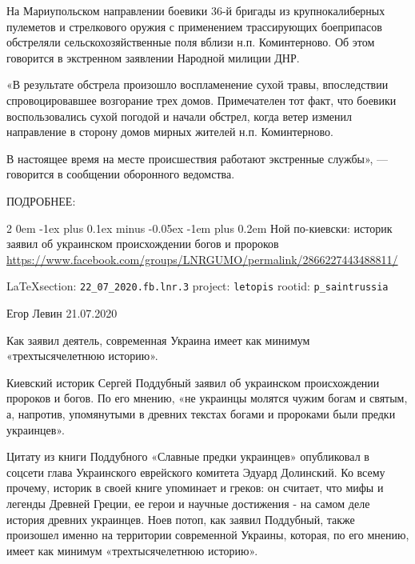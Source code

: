\documentclass[a4paper,11pt]{extreport}
\makeatletter
\renewcommand\subsection{%
  \clearpage
    \@startsection{subsection}%
    {2}%
    {0em}%
    {-1ex plus 0.1ex minus -0.05ex}%
    {-1em plus 0.2em}%
    {\scshape\bfseries\Large}%
}
\makeatother
\begin{document}
На Мариупольском направлении боевики 36-й бригады из крупнокалиберных пулеметов
и стрелкового оружия с применением трассирующих боеприпасов обстреляли
сельскохозяйственные поля вблизи н.п. Коминтерново. Об этом говорится в
экстренном заявлении Народной милиции ДНР.

«В результате обстрела произошло воспламенение сухой травы, впоследствии
спровоцировавшее возгорание трех домов. Примечателен тот факт, что боевики
воспользовались сухой погодой и начали обстрел, когда ветер изменил направление
в сторону домов мирных жителей н.п. Коминтерново.

В настоящее время на месте происшествия работают экстренные службы», —
говорится в сообщении оборонного ведомства.

ПОДРОБНЕЕ:
 
 
  
\subsection{Ной по-киевски: историк заявил об украинском происхождении богов и пророков}
\label{sec:22_07_2020.fb.lnr.3}
\url{https://www.facebook.com/groups/LNRGUMO/permalink/2866227443488811/}

\vspace{0.5cm}
{\small\LaTeX section: \verb|22_07_2020.fb.lnr.3| project: \verb|letopis| rootid: \verb|p_saintrussia|}
\vspace{0.5cm}


Егор Левин
21.07.2020

Как заявил деятель, современная Украина имеет как минимум «трехтысячелетнюю
историю».

Киевский историк Сергей Поддубный заявил об украинском происхождении пророков и
богов. По его мнению, «не украинцы молятся чужим богам и святым, а, напротив,
упомянутыми в древних текстах богами и пророками были предки украинцев».

Цитату из книги Поддубного «Славные предки украинцев» опубликовал в соцсети
глава Украинского еврейского комитета Эдуард Долинский. Ко всему прочему,
историк в своей книге упоминает и греков: он считает, что мифы и легенды
Древней Греции, ее герои и научные достижения - на самом деле история древних
украинцев.  Ноев потоп, как заявил Поддубный, также произошел именно на
территории современной Украины, которая, по его мнению, имеет как минимум
«трехтысячелетнюю историю».
\end{document}
